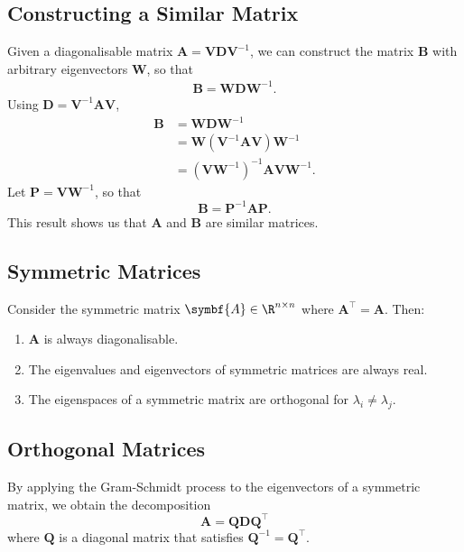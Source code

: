 \documentclass{article}
\begin{document}
\subsection{Constructing a Similar Matrix}
Given a diagonalisable matrix \(\symbf{A} = \symbf{V}\symbf{D}\symbf{V}^{-1}\), we can construct the matrix \(\symbf{B}\) with arbitrary eigenvectors
\(\symbf{W}\), so that
\begin{align*}
    \symbf{B} = \symbf{W} \symbf{D} \symbf{W}^{-1}.
\end{align*}
Using \(\symbf{D} = \symbf{V}^{-1} \symbf{A} \symbf{V}\),
\begin{align*}
    \symbf{B} & = \symbf{W} \symbf{D} \symbf{W}^{-1}                                               \\
              & = \symbf{W} \left( \symbf{V}^{-1} \symbf{A} \symbf{V} \right) \symbf{W}^{-1}       \\
              & = \left( \symbf{V} \symbf{W}^{-1} \right)^{-1} \symbf{A} \symbf{V} \symbf{W}^{-1}.
\end{align*}
Let \(\symbf{P} = \symbf{V} \symbf{W}^{-1}\), so that
\begin{equation*}
    \symbf{B} = \symbf{P}^{-1} \symbf{A} \symbf{P}.
\end{equation*}
This result shows us that \(\symbf{A}\) and \(\symbf{B}\) are similar matrices.
\subsection{Symmetric Matrices}
Consider the symmetric matrix \(\symbf{A}\in\R^{n \times n}\) where \(\symbf{A}^\top = \symbf{A}\).
Then:
\begin{enumerate}
    \item \(\symbf{A}\) is always diagonalisable.
    \item The eigenvalues and eigenvectors of symmetric matrices are always real.
    \item The eigenspaces of a symmetric matrix are orthogonal for \(\lambda_i \neq \lambda_j\).
\end{enumerate}
\subsection{Orthogonal Matrices}
By applying the Gram-Schmidt process to the eigenvectors of a symmetric matrix, we obtain the decomposition
\begin{equation*}
    \symbf{A} = \symbf{Q} \symbf{D} \symbf{Q}^\top
\end{equation*}
where \(\symbf{Q}\) is a diagonal matrix that satisfies \(\symbf{Q}^{-1} = \symbf{Q}^\top\).
\end{document}
